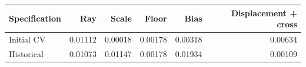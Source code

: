 \begin{tabular}{lrrrrr}
\toprule
Specification & Ray & Scale & Floor & Bias & Displacement + cross \\
\midrule
Initial CV & 0.01112 & 0.00018 & 0.00178 & 0.00318 & 0.00634 \\
Historical & 0.01073 & 0.01147 & 0.00178 & 0.01934 & 0.00109 \\
\bottomrule
\end{tabular}
